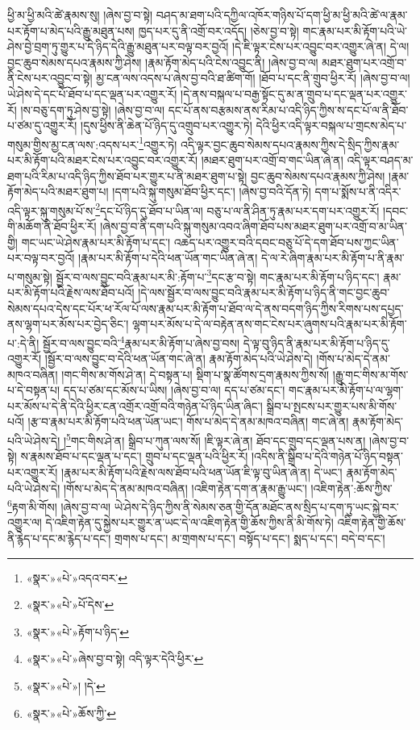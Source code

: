 ཕྱི་མ་ཕྱི་མའི་ཚེ་རྣམས་སུ། །ཞེས་བྱ་བ་སྟེ། བཤད་མ་ཐག་པའི་དཀྱིལ་འཁོར་གཉིས་པོ་དག་ཕྱི་མ་ཕྱི་མའི་ཚེ་ལ་རྣམ་པར་རྟོག་པ་མེད་པའི་རྒྱུ་མཐུན་པས། ཁྱད་པར་དུ་ནི་འགྲོ་བར་འདོད། །ཅེས་བྱ་བ་སྟེ། གང་རྣམ་པར་མི་རྟོག་པའི་ཡེ་ཤེས་བྱེ་བྲག་ཏུ་གྱུར་པ་དེ་ཉིད་དེའི་རྒྱུ་མཐུན་པར་བལྟ་བར་བྱའོ། །དེ་ཇི་ལྟར་ངེས་པར་འབྱུང་བར་འགྱུར་ཞེ་ན། དེ་ལ། བྱང་ཆུབ་སེམས་དཔའ་རྣམས་ཀྱི་ཤེས། །རྣམ་རྟོག་མེད་པའི་ངེས་འབྱུང་ནི། །ཞེས་བྱ་བ་ལ། མཐར་ཐུག་པར་འགྲོ་བ་ནི་ངེས་པར་འབྱུང་བ་སྟེ། མྱ་ངན་ལས་འདས་པ་ཞེས་བྱ་བའི་ཐ་ཚིག་གོ། །ཐོབ་པ་དང་ནི་གྲུབ་ཕྱིར་རོ། །ཞེས་བྱ་བ་ལ། ཡེ་ཤེས་དེ་དང་པོ་ཐོབ་པ་དང་ལྡན་པར་འགྱུར་རོ། །དེ་ནས་བསྐལ་པ་བརྒྱ་སྟོང་དུ་མ་ན་གྲུབ་པ་དང་ལྡན་པར་འགྱུར་རོ། །ས་བཅུ་དག་ཏུ་ཤེས་བྱ་སྟེ། །ཞེས་བྱ་བ་ལ། དང་པོ་ནས་བརྩམས་ནས་རིམ་པ་འདི་ཉིད་ཀྱིས་ས་དང་པོ་ལ་ནི་ཐོབ་པ་ཙམ་དུ་འགྱུར་རོ། །དུས་ཕྱིས་ནི་ཆེན་པོ་ཉིད་དུ་འགྲུབ་པར་འགྱུར་ཏེ། དེའི་ཕྱིར་འདི་ལྟར་བསྐལ་པ་གྲངས་མེད་པ་གསུམ་གྱིས་མྱ་ངན་ལས་:འདས་པར་\footnote{«སྣར་»«པེ་»འདའ་བར་}འགྱུར་ཏེ། འདི་ལྟར་བྱང་ཆུབ་སེམས་དཔའ་རྣམས་ཀྱིས་དེ་སྲིད་ཀྱིས་རྣམ་པར་མི་རྟོག་པའི་མཐར་ངེས་པར་འབྱུང་བར་འགྱུར་རོ། །མཐར་ཐུག་པར་འགྲོ་བ་གང་ཡིན་ཞེ་ན། འདི་ལྟར་བཤད་མ་ཐག་པའི་རིམ་པ་འདི་ཉིད་ཀྱིས་ཐོབ་པར་གྱུར་པ་ནི་མཐར་ཐུག་པ་སྟེ། བྱང་ཆུབ་སེམས་དཔའ་རྣམས་ཀྱི་ཤེས། །རྣམ་རྟོག་མེད་པའི་མཐར་ཐུག་པ། །དག་པའི་སྐུ་གསུམ་ཐོབ་ཕྱིར་དང་། །ཞེས་བྱ་བའི་དོན་ཏེ། དག་པ་སྨོས་པ་ནི་འདིར་འདི་ལྟར་སྐུ་གསུམ་པོ་ས་\footnote{«སྣར་»«པེ་»པོ་དེས་}དང་པོ་ཉིད་དུ་ཐོབ་པ་ཡིན་ལ། བཅུ་པ་ལ་ནི་ཤིན་ཏུ་རྣམ་པར་དག་པར་འགྱུར་རོ། །དབང་གི་མཆོག་ནི་ཐོབ་ཕྱིར་རོ། །ཞེས་བྱ་བ་ནི་དག་པའི་སྐུ་གསུམ་འབའ་ཞིག་ཐོབ་པས་མཐར་ཐུག་པར་འགྲོ་བ་མ་ཡིན་གྱི། གང་ཡང་ཡེ་ཤེས་རྣམ་པར་མི་རྟོག་པ་དང་། འཆད་པར་འགྱུར་བའི་དབང་བཅུ་པོ་དེ་དག་ཐོབ་པས་ཀྱང་ཡིན་པར་བལྟ་བར་བྱའོ། །རྣམ་པར་མི་རྟོག་པ་དེའི་ཕན་ཡོན་གང་ཡིན་ཞེ་ན། དེ་ལ་རེ་ཞིག་རྣམ་པར་མི་རྟོག་པ་ནི་རྣམ་པ་གསུམ་སྟེ། སྦྱོར་བ་ལས་བྱུང་བའི་རྣམ་པར་མི་:རྟོག་པ་\footnote{«སྣར་»«པེ་»རྟོག་པ་ཉིད་}དང་རྩ་བ་སྟེ། གང་རྣམ་པར་མི་རྟོག་པ་ཉིད་དང་། རྣམ་པར་མི་རྟོག་པའི་རྗེས་ལས་ཐོབ་པའོ། །དེ་ལས་སྦྱོར་བ་ལས་བྱུང་བའི་རྣམ་པར་མི་རྟོག་པ་ཉིད་ནི་གང་བྱང་ཆུབ་སེམས་དཔའ་དེས་དང་པོར་ཕ་རོལ་པོ་ལས་རྣམ་པར་མི་རྟོག་པ་ཐོབ་ལ་དེ་ནས་བདག་ཉིད་ཀྱིས་རིགས་པས་དཔྱད་ནས་ལྷག་པར་མོས་པར་བྱེད་ཅིང་། ལྷག་པར་མོས་པ་དེ་ལ་བརྟེན་ནས་གང་ངེས་པར་ཞུགས་པའི་རྣམ་པར་མི་རྟོག་པ་:དེ་ནི། སྦྱོར་བ་ལས་བྱུང་བའི་\footnote{«སྣར་»«པེ་»ཞེས་བྱ་བ་སྟེ། འདི་ལྟར་དེའི་ཕྱིར་}རྣམ་པར་མི་རྟོག་པ་ཞེས་བྱ་བས། དེ་ལྟ་བུ་ཉིད་ནི་རྣམ་པར་མི་རྟོག་པ་ཉིད་དུ་འགྱུར་རོ། །སྦྱོར་བ་ལས་བྱུང་བ་དེའི་ཕན་ཡོན་གང་ཞེ་ན། རྣམ་རྟོག་མེད་པའི་ཡེ་ཤེས་དེ། །གོས་པ་མེད་དེ་ནམ་མཁའ་བཞིན། །གང་གིས་མ་གོས་ཤེ་ན། དེ་བསྟན་པ། སྡིག་པ་སྣ་ཚོགས་དྲག་རྣམས་ཀྱིས་སོ། །རྒྱུ་གང་གིས་མ་གོས་པ་དེ་བསྟན་པ། དད་པ་ཙམ་དང་མོས་པ་ཡིས། །ཞེས་བྱ་བ་ལ། དད་པ་ཙམ་དང་། གང་རྣམ་པར་མི་རྟོག་པ་ལ་ལྷག་པར་མོས་པ་དེ་ནི་དེའི་ཕྱིར་ངན་འགྲོར་འགྲོ་བའི་གཉེན་པོ་ཉིད་ཡིན་ཞིང་། སྒྲིབ་པ་སྤངས་པར་གྱུར་པས་མི་གོས་པའོ། །རྩ་བ་རྣམ་པར་མི་རྟོག་པའི་ཕན་ཡོན་ཡང་། གོས་པ་མེད་དེ་ནམ་མཁའ་བཞིན། གང་ཞེ་ན། རྣམ་རྟོག་མེད་པའི་ཡེ་ཤེས་དེ། །\footnote{«སྣར་»«པེ་»། །དེ་}གང་གིས་ཤེ་ན། སྒྲིབ་པ་ཀུན་ལས་སོ། །ཇི་ལྟར་ཞེ་ན། ཐོབ་དང་གྲུབ་དང་ལྡན་པས་ན། །ཞེས་བྱ་བ་སྟེ། ས་རྣམས་ཐོབ་པ་དང་ལྡན་པ་དང་། གྲུབ་པ་དང་ལྡན་པའི་ཕྱིར་རོ། །འདིས་ནི་སྒྲིབ་པ་དེའི་གཉེན་པོ་ཉིད་བསྟན་པར་འགྱུར་རོ། །རྣམ་པར་མི་རྟོག་པའི་རྗེས་ལས་ཐོབ་པའི་ཕན་ཡོན་ཇི་ལྟ་བུ་ཡིན་ཞེ་ན། དེ་ཡང་། རྣམ་རྟོག་མེད་པའི་ཡེ་ཤེས་དེ། །གོས་པ་མེད་དེ་ནམ་མཁའ་བཞིན། །འཇིག་རྟེན་དག་ན་རྣམ་རྒྱུ་ཡང་། །འཇིག་རྟེན་:ཆོས་ཀྱིས་\footnote{«སྣར་»«པེ་»ཆོས་ཀྱི་}རྟག་མི་གོས། །ཞེས་བྱ་བ་ལ། ཡེ་ཤེས་དེ་ཉིད་ཀྱིས་ནི་སེམས་ཅན་གྱི་དོན་མཐོང་ནས་སྲིད་པ་དག་ཏུ་ཡང་སྐྱེ་བར་འགྱུར་ལ། དེ་འཇིག་རྟེན་དུ་སྐྱེས་པར་གྱུར་ན་ཡང་དེ་ལ་འཇིག་རྟེན་གྱི་ཆོས་ཀྱིས་ནི་མི་གོས་ཏེ། འཇིག་རྟེན་གྱི་ཆོས་ནི་རྙེད་པ་དང་མ་རྙེད་པ་དང་། གྲགས་པ་དང་། མ་གྲགས་པ་དང་། བསྟོད་པ་དང་། སྨད་པ་དང་། བདེ་བ་དང་། 